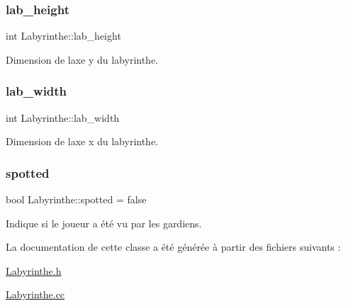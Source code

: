 \mbox{\label{classLabyrinthe_af48dc244a25af5aac1a9fca668dee82d}} 
\subsubsection{\texorpdfstring{lab\+\_\+height}{lab\_height}}
{\footnotesize\ttfamily int Labyrinthe\+::lab\+\_\+height\hspace{0.3cm}{\ttfamily [private]}}



Dimension de l\textquotesingle{}axe \textquotesingle{}y\textquotesingle{} du labyrinthe. 

\mbox{\label{classLabyrinthe_a6ae1d76761645024106ad6374305dd02}} 
\subsubsection{\texorpdfstring{lab\+\_\+width}{lab\_width}}
{\footnotesize\ttfamily int Labyrinthe\+::lab\+\_\+width\hspace{0.3cm}{\ttfamily [private]}}



Dimension de l\textquotesingle{}axe \textquotesingle{}x\textquotesingle{} du labyrinthe. 

\mbox{\label{classLabyrinthe_a228978d8d96f63a3e97b07c7d04b3594}} 
\subsubsection{\texorpdfstring{spotted}{spotted}}
{\footnotesize\ttfamily bool Labyrinthe\+::spotted = false\hspace{0.3cm}{\ttfamily [private]}}



Indique si le joueur a été vu par les gardiens. 



La documentation de cette classe a été générée à partir des fichiers suivants \+:\begin{DoxyCompactItemize}
\item 
\hyperlink{Labyrinthe_8h}{Labyrinthe.\+h}\item 
\hyperlink{Labyrinthe_8cc}{Labyrinthe.\+cc}\end{DoxyCompactItemize}
